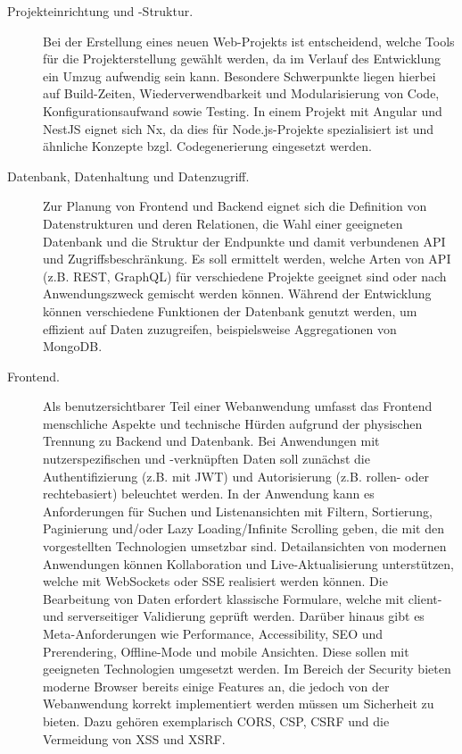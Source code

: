 \begin{description}
    \item[Projekteinrichtung und -Struktur.] Bei der Erstellung eines neuen Web-Projekts ist entscheidend, welche Tools für die Projekterstellung gewählt werden, da im Verlauf des Entwicklung ein Umzug aufwendig sein kann.
    Besondere Schwerpunkte liegen hierbei auf Build-Zeiten, Wiederverwendbarkeit und Modularisierung von Code, Konfigurationsaufwand sowie Testing.
    In einem Projekt mit Angular und NestJS eignet sich Nx, da dies für Node.js-Projekte spezialisiert ist und ähnliche Konzepte bzgl. Codegenerierung eingesetzt werden.
    \item[Datenbank, Datenhaltung und Datenzugriff.] Zur Planung von Frontend und Backend eignet sich die Definition von Datenstrukturen und deren Relationen, die Wahl einer geeigneten Datenbank und die Struktur der Endpunkte und damit verbundenen API und Zugriffsbeschränkung.
    Es soll ermittelt werden, welche Arten von API (z.B. REST, GraphQL) für verschiedene Projekte geeignet sind oder nach Anwendungszweck gemischt werden können.
    Während der Entwicklung können verschiedene Funktionen der Datenbank genutzt werden, um effizient auf Daten zuzugreifen, beispielsweise Aggregationen von MongoDB.
    \item[Frontend.] Als benutzersichtbarer Teil einer Webanwendung umfasst das Frontend menschliche Aspekte und technische Hürden aufgrund der physischen Trennung zu Backend und Datenbank.
    Bei Anwendungen mit nutzerspezifischen und -verknüpften Daten soll zunächst die Authentifizierung (z.B. mit JWT) und Autorisierung (z.B. rollen- oder rechtebasiert) beleuchtet werden.
    In der Anwendung kann es Anforderungen für Suchen und Listenansichten mit Filtern, Sortierung, Paginierung und/oder Lazy Loading/Infinite Scrolling geben, die mit den vorgestellten Technologien umsetzbar sind.
    Detailansichten von modernen Anwendungen können Kollaboration und Live-Aktualisierung unterstützen, welche mit WebSockets oder SSE realisiert werden können.
    Die Bearbeitung von Daten erfordert klassische Formulare, welche mit client- und serverseitiger Validierung geprüft werden.
    Darüber hinaus gibt es Meta-Anforderungen wie Performance, Accessibility, SEO und Prerendering, Offline-Mode und mobile Ansichten.
    Diese sollen mit geeigneten Technologien umgesetzt werden.
    Im Bereich der Security bieten moderne Browser bereits einige Features an, die jedoch von der Webanwendung korrekt implementiert werden müssen um Sicherheit zu bieten.
    Dazu gehören exemplarisch CORS, CSP, CSRF und die Vermeidung von XSS und XSRF.

\end{description}
